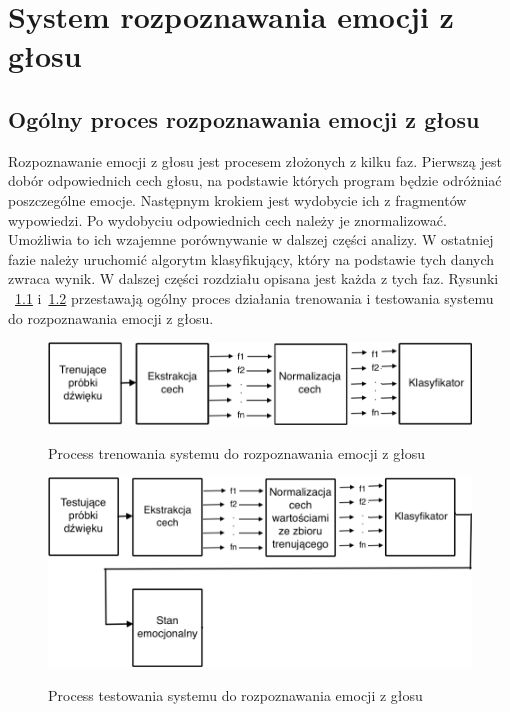 \documentclass[declaration,shortabstract]{iithesis}
\begin{document}
\chapter{System rozpoznawania emocji z głosu}
\section{Ogólny proces rozpoznawania emocji z głosu}
Rozpoznawanie emocji z głosu jest procesem złożonych z kilku faz.
Pierwszą jest dobór odpowiednich cech głosu, na podstawie których program będzie odróżniać poszczególne emocje. Następnym krokiem jest wydobycie ich z fragmentów wypowiedzi. Po wydobyciu odpowiednich cech należy je znormalizować. Umożliwia to ich wzajemne porównywanie w dalszej części analizy. W ostatniej fazie należy uruchomić algorytm klasyfikujący, który na podstawie tych danych zwraca wynik.
W dalszej części rozdziału opisana jest każda z tych faz. Rysunki ~\ref{ser_tren} i~\ref{ser_test} przestawają ogólny proces działania trenowania i testowania systemu do rozpoznawania emocji z głosu.

\begin{figure}[!htb]
\hspace*{-6cm}
	\caption{Process trenowania systemu do rozpoznawania emocji z głosu}
	\includegraphics[scale=0.40]{trenowanie.png}
\label{ser_tren}
\end{figure}

\begin{figure}[!htb]
\hspace*{-6cm}  
	\caption{Process testowania systemu do rozpoznawania emocji z głosu}
	\includegraphics[scale=0.35]{testowanie.png}
\label{ser_test}
\end{figure}
\end{document}
